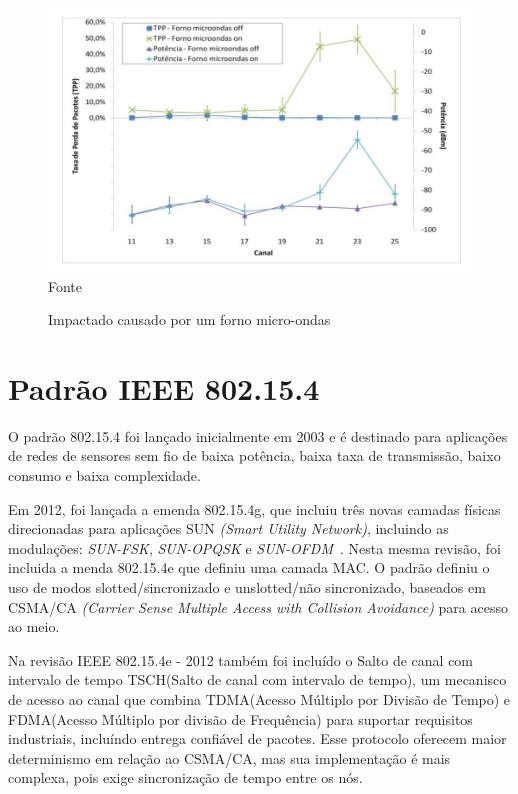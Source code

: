 \begin{figure}[h]
\label{fig:microondas}
    \caption{\footnotesize Impactado causado por um forno micro-ondas\cite{gomes2012correlation}}
    \centering\includegraphics[scale=0.8]{sections/textual/Imagens/experimentoRuan.png}\\
    Fonte \cite{gomes2012correlation}
\end{figure}

\newpage
\section{Padrão IEEE 802.15.4}
\label{sec:padrão}

O padrão 802.15.4 foi lançado inicialmente em 2003 e é destinado para aplicações de redes de sensores sem fio de baixa potência, baixa taxa de transmissão, baixo consumo e baixa complexidade. 

Em 2012, foi lançada a emenda 802.15.4g, que incluiu três novas camadas físicas direcionadas para aplicações SUN \textit{(Smart Utility Network)}, incluindo as modulações: \textit{SUN-FSK}, \textit{SUN-OPQSK} e \textit{SUN-OFDM}~\cite{7460875}. Nesta mesma revisão, foi incluida a menda 802.15.4e que definiu uma camada MAC. O padrão definiu o uso de modos slotted/sincronizado e unslotted/não sincronizado, baseados em CSMA/CA \textit{(Carrier Sense Multiple Access with Collision Avoidance)} para acesso ao meio\cite{gomes2020improving}.

Na revisão IEEE 802.15.4e - 2012 também foi incluído o Salto de canal com intervalo de tempo TSCH(Salto de canal com intervalo de tempo), um mecanisco de acesso ao canal que combina TDMA(Acesso Múltiplo por Divisão de Tempo) e FDMA(Acesso Múltiplo por divisão de Frequência) para suportar requisitos industriais, incluíndo entrega confiável de pacotes. Esse protocolo oferecem maior determinismo em relação ao CSMA/CA, mas sua implementação é mais complexa, pois exige sincronização de tempo entre os nós\cite{gomes2020improving}.


